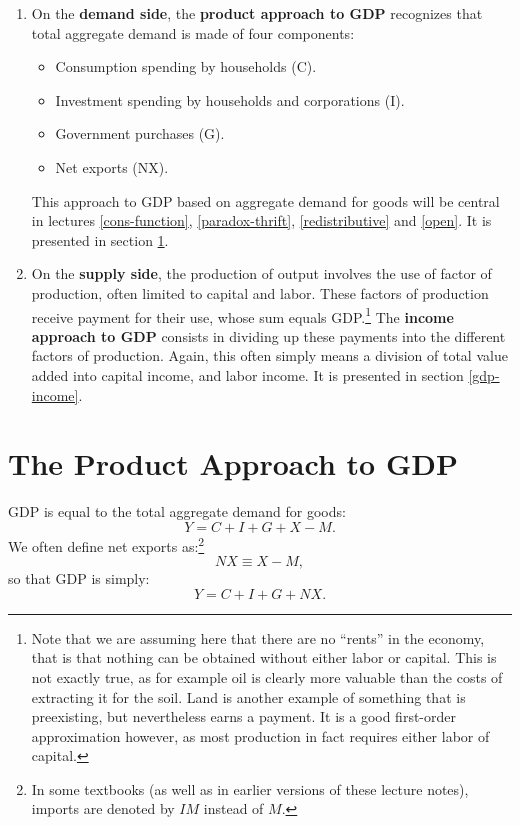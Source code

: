 \documentclass[]{book}
\providecommand{\tightlist}{%
  \setlength{\itemsep}{0pt}\setlength{\parskip}{0pt}}
\let\rmarkdownfootnote\footnote%
\def\footnote{\protect\rmarkdownfootnote}
\theoremstyle{definition}
\theoremstyle{definition}
\theoremstyle{definition}
\theoremstyle{remark}
\begin{document}
\begin{enumerate}
\def\labelenumi{\arabic{enumi}.}
\item
  On the \textbf{demand side}, the \textbf{product approach to GDP}
  recognizes that total aggregate demand is made of four components:

  \begin{itemize}
  \tightlist
  \item
    Consumption spending by households (C).
  \item
    Investment spending by households and corporations (I).
  \item
    Government purchases (G).
  \item
    Net exports (NX).
  \end{itemize}

  This approach to GDP based on aggregate demand for goods will be
  central in lectures \ref{cons-function}, \ref{paradox-thrift},
  \ref{redistributive} and \ref{open}. It is presented in section
  \ref{gdp-product}.
\item
  On the \textbf{supply side}, the production of output involves the use
  of factor of production, often limited to capital and labor. These
  factors of production receive payment for their use, whose sum equals
  GDP.\footnote{Note that we are assuming here that there are no
    ``rents'' in the economy, that is that nothing can be obtained
    without either labor or capital. This is not exactly true, as for
    example oil is clearly more valuable than the costs of extracting it
    for the soil. Land is another example of something that is
    preexisting, but nevertheless earns a payment. It is a good
    first-order approximation however, as most production in fact
    requires either labor of capital.} The \textbf{income approach to
  GDP} consists in dividing up these payments into the different factors
  of production. Again, this often simply means a division of total
  value added into capital income, and labor income. It is presented in
  section \ref{gdp-income}.
\end{enumerate}

\section{The Product Approach to GDP}\label{gdp-product}

GDP is equal to the total aggregate demand for goods:
\[ Y = C + I + G + X -M.\] We often define net exports as:\footnote{In
  some textbooks (as well as in earlier versions of these lecture
  notes), imports are denoted by \(IM\) instead of \(M\).}
\[NX \equiv X-M,\] so that GDP is simply: \[ Y = C + I + G + NX.\]
\end{document}
